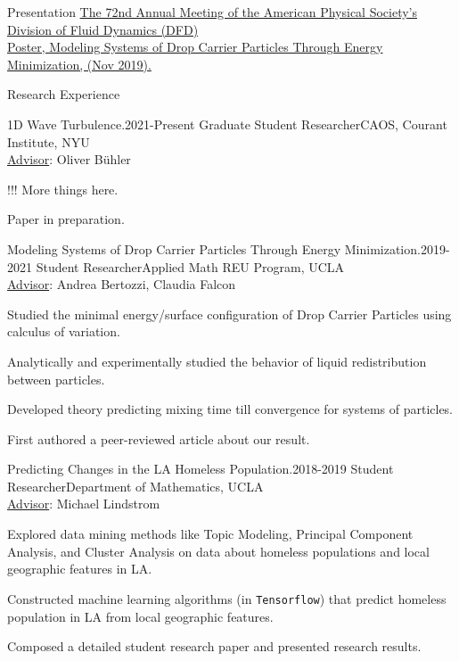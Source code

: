 \documentclass{resume} %
\begin{document}
\begin{rSection}{Presentation}
\href{https://meetings.aps.org/Meeting/DFD19/Session/NP05.36}{The 72nd Annual Meeting of the American Physical Society's Division of Fluid Dynamics (DFD)\\
Poster, Modeling Systems of Drop Carrier Particles Through Energy Minimization,  (Nov 2019).}
\end{rSection}


\begin{rSection}{Research Experience}

\begin{rSubsection}{1D Wave Turbulence.}{2021-Present}
{Graduate Student Researcher}{CAOS, Courant Institute, NYU\\\underline{Advisor}: Oliver B\"uhler}
\item !!! More things here. 
\item Paper in preparation.
\end{rSubsection}

\begin{rSubsection}{Modeling Systems of Drop Carrier Particles Through Energy
Minimization.}{2019-2021}
{Student Researcher}{Applied Math REU Program, UCLA\\\underline{Advisor}: Andrea Bertozzi, Claudia Falcon}

\item Studied the minimal energy/surface configuration of Drop Carrier Particles using calculus of variation.
\item Analytically and experimentally studied the behavior of liquid redistribution between particles.
\item Developed theory predicting mixing time till convergence for systems of particles.
\item First authored a peer-reviewed article about our result.
\end{rSubsection}

\begin{rSubsection}{Predicting Changes in the LA Homeless Population.}{2018-2019}
{Student Researcher}{Department of Mathematics, UCLA\\\underline{Advisor}: Michael Lindstrom}
\item Explored data mining methods like Topic Modeling, Principal Component Analysis, and Cluster Analysis on data about homeless populations and local geographic features in LA.
\item  Constructed machine learning algorithms (in \texttt{Tensorflow}) that predict homeless population in LA from local geographic features.
\item Composed a detailed student research paper and presented research results. 
\end{rSubsection}

\end{rSection}
\end{document}
